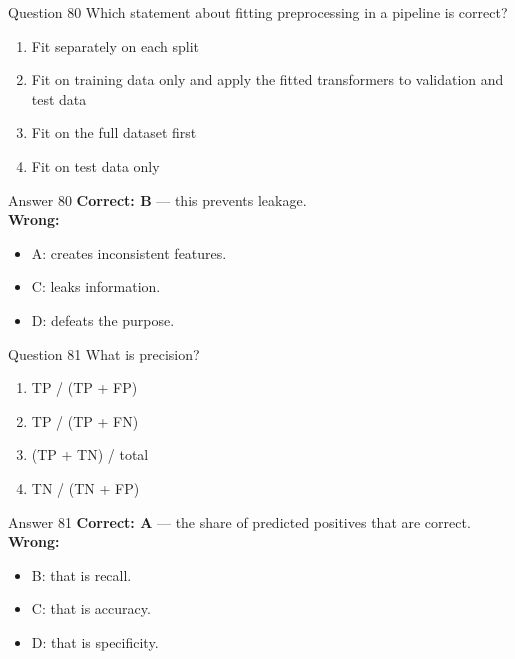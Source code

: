 \documentclass[aspectratio=169,11pt]{beamer}
\begin{document}
\begin{frame}{Question 80}
Which statement about fitting preprocessing in a pipeline is correct?
\begin{enumerate}[label=\Alph*.]
\item Fit separately on each split
\item Fit on training data only and apply the fitted transformers to validation and test data
\item Fit on the full dataset first
\item Fit on test data only
\end{enumerate}
\end{frame}
\begin{frame}{Answer 80}
\textbf{Correct: B} --- this prevents leakage.\\
\vspace{0.5em}
\textbf{Wrong:}
\begin{itemize}
\item A: creates inconsistent features.
\item C: leaks information.
\item D: defeats the purpose.
\end{itemize}
\end{frame}

\begin{frame}{Question 81}
What is precision?
\begin{enumerate}[label=\Alph*.]
\item TP / (TP + FP)
\item TP / (TP + FN)
\item (TP + TN) / total
\item TN / (TN + FP)
\end{enumerate}
\end{frame}
\begin{frame}{Answer 81}
\textbf{Correct: A} --- the share of predicted positives that are correct.\\
\vspace{0.5em}
\textbf{Wrong:}
\begin{itemize}
\item B: that is recall.
\item C: that is accuracy.
\item D: that is specificity.
\end{itemize}
\end{frame}
\end{document}
